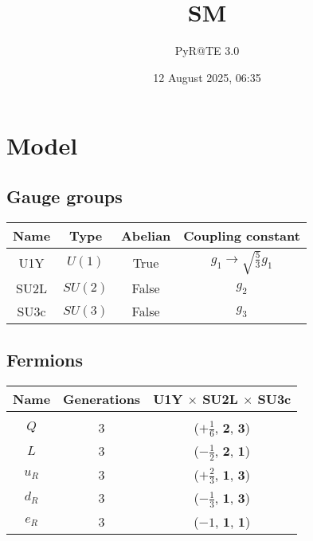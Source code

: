 \documentclass[12pt]{article}
\title{SM}
\author{PyR@TE 3.0}
\date{12 August 2025, 06:35}
\begin{document}
    \maketitle
    \tableofcontents
    \clearpage

\section{Model}

\subsection{Gauge groups}

\begin{table}[h]
\renewcommand{\arraystretch}{1.3}
\centering
\begin{tabular}{c@{\hskip .66cm}c@{\hskip .66cm}c@{\hskip .5cm}c}
\hline
Name & Type & Abelian & Coupling constant \\ \hline
U1Y & $U(1)$ & True & $g_1\rightarrow\sqrt{\frac{5}{3}} g_{1}$ \\
SU2L & $SU(2)$ & False & $g_2$ \\
SU3c & $SU(3)$ & False & $g_3$ \\ \hline
\end{tabular}
\end{table}

\subsection{Fermions}

\begin{table}[h]
\renewcommand{\arraystretch}{1.15}
\centering
\begin{tabular}{c@{\hskip .66cm}c@{\hskip .66cm}c}
\hline
Name & Generations & U1Y $\times$ SU2L $\times$ SU3c\\ \hline \\ [-2ex]
$Q$ & 3 & ($+\frac{1}{6}$, $\mathbf{2}$, $\mathbf{3}$) \\[.2cm]
$L$ & 3 & ($- \frac{1}{2}$, $\mathbf{2}$, $\mathbf{1}$) \\[.2cm]
$u_R$ & 3 & ($+\frac{2}{3}$, $\mathbf{1}$, $\mathbf{3}$) \\[.2cm]
$d_R$ & 3 & ($- \frac{1}{3}$, $\mathbf{1}$, $\mathbf{3}$) \\[.2cm]
$e_R$ & 3 & ($-1$, $\mathbf{1}$, $\mathbf{1}$) \\[.1cm] \hline
\end{tabular}
\end{table}
\end{document}
